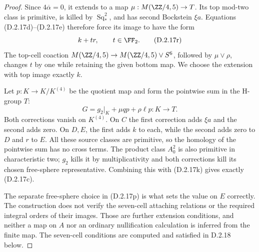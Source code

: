\begin{proof}
Since $4\overline\alpha=0$, it extends to a map
$\mu:M(\ZZ/4,5)\to T$. Its top mod-two class is primitive,
is killed by $\operatorname{Sq}_*^2$, and has second
Bockstein $\xi a$. Equations \textup{(D.2.17d)--(D.2.17e)}
therefore force its image to have the form
\[
 k+t r,\qquad t\in\FF_2.
 \tag{D.2.17r}
\]
The top-cell coaction
$M(\ZZ/4,5)\to M(\ZZ/4,5)\vee S^6$, followed by
$\mu\vee\rho$, changes $t$ by one while retaining the given
bottom map. We choose the extension with top image exactly $k$.

Let $p:K\to K/K^{(4)}$ be the quotient map and form the
pointwise sum in the H-group $T$:
\[
 G=g_2|_K+\mu q p+\rho\ell p:K\longrightarrow T.
 \tag{D.2.17s}
\]
Both corrections vanish on $K^{(4)}$. On $C$ the first
correction adds $\xi a$ and the second adds zero. On $D,E$,
the first adds $k$ to each, while the second adds zero to $D$
and $r$ to $E$. All these source classes are primitive, so
the homology of the pointwise sum has no cross terms. The
product class $A_0^2$ is also primitive in characteristic two;
$g_2$ kills it by multiplicativity and both corrections kill
its chosen free-sphere representative. Combining this with
\textup{(D.2.17k)} gives exactly \textup{(D.2.17c)}.

The separate free-sphere choice in \textup{(D.2.17p)} is what
sets the value on $E$ correctly. The construction does not
verify the seven-cell attaching relations or the required
integral orders of their images. Those are further extension
conditions, and neither a map on $A$ nor an ordinary
nullification calculation is inferred from the finite map.
The seven-cell conditions are computed and satisfied in D.2.18 below.
\end{proof}
